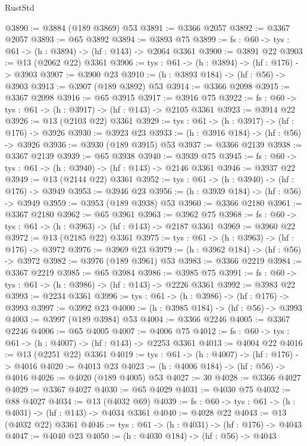 \begin{lexlean}{RustStd}
\begin{coremodule}
@3890 := @3884 (@189 @3869) @53
@3891 := @3366 @2057
@3892 := @3367 @2057
@3893 := @65 @3892
@3894 := @3893 @75
@3899 := {fs : @60} -> {tys : @61} -> (h : @3894) -> (hf : @143) -> @2064 @3361
@3900 := @3891 @22
@3903 := @13 (@2062 @22) @3361
@3906 := {tys : @61} -> (h : @3894) -> (hf : @176) -> @3903
@3907 := @3900 @23
@3910 := (h : @3893 @184) -> (hf : @56) -> @3903
@3913 := @3907 (@189 @3892) @53
@3914 := @3366 @2098
@3915 := @3367 @2098
@3916 := @65 @3915
@3917 := @3916 @75
@3922 := {fs : @60} -> {tys : @61} -> (h : @3917) -> (hf : @143) -> @2105 @3361
@3923 := @3914 @22
@3926 := @13 (@2103 @22) @3361
@3929 := {tys : @61} -> (h : @3917) -> (hf : @176) -> @3926
@3930 := @3923 @23
@3933 := (h : @3916 @184) -> (hf : @56) -> @3926
@3936 := @3930 (@189 @3915) @53
@3937 := @3366 @2139
@3938 := @3367 @2139
@3939 := @65 @3938
@3940 := @3939 @75
@3945 := {fs : @60} -> {tys : @61} -> (h : @3940) -> (hf : @143) -> @2146 @3361
@3946 := @3937 @22
@3949 := @13 (@2144 @22) @3361
@3952 := {tys : @61} -> (h : @3940) -> (hf : @176) -> @3949
@3953 := @3946 @23
@3956 := (h : @3939 @184) -> (hf : @56) -> @3949
@3959 := @3953 (@189 @3938) @53
@3960 := @3366 @2180
@3961 := @3367 @2180
@3962 := @65 @3961
@3963 := @3962 @75
@3968 := {fs : @60} -> {tys : @61} -> (h : @3963) -> (hf : @143) -> @2187 @3361
@3969 := @3960 @22
@3972 := @13 (@2185 @22) @3361
@3975 := {tys : @61} -> (h : @3963) -> (hf : @176) -> @3972
@3976 := @3969 @23
@3979 := (h : @3962 @184) -> (hf : @56) -> @3972
@3982 := @3976 (@189 @3961) @53
@3983 := @3366 @2219
@3984 := @3367 @2219
@3985 := @65 @3984
@3986 := @3985 @75
@3991 := {fs : @60} -> {tys : @61} -> (h : @3986) -> (hf : @143) -> @2226 @3361
@3992 := @3983 @22
@3993 := @2234 @3361
@3996 := {tys : @61} -> (h : @3986) -> (hf : @176) -> @3993
@3997 := @3992 @23
@4000 := (h : @3985 @184) -> (hf : @56) -> @3993
@4003 := @3997 (@189 @3984) @53
@4004 := @3366 @2246
@4005 := @3367 @2246
@4006 := @65 @4005
@4007 := @4006 @75
@4012 := {fs : @60} -> {tys : @61} -> (h : @4007) -> (hf : @143) -> @2253 @3361
@4013 := @4004 @22
@4016 := @13 (@2251 @22) @3361
@4019 := {tys : @61} -> (h : @4007) -> (hf : @176) -> @4016
@4020 := @4013 @23
@4023 := (h : @4006 @184) -> (hf : @56) -> @4016
@4026 := @4020 (@189 @4005) @53
@4027 := 30
@4028 := @3366 @4027
@4029 := @3367 @4027
@4030 := @65 @4029
@4031 := @4030 @75
@4032 := @88 @4027
@4034 := @13 (@4032 @69)
@4039 := {fs : @60} -> {tys : @61} -> (h : @4031) -> (hf : @143) -> @4034 @3361
@4040 := @4028 @22
@4043 := @13 (@4032 @22) @3361
@4046 := {tys : @61} -> (h : @4031) -> (hf : @176) -> @4043
@4047 := @4040 @23
@4050 := (h : @4030 @184) -> (hf : @56) -> @4043

\end{coremodule}
\end{lexlean}
